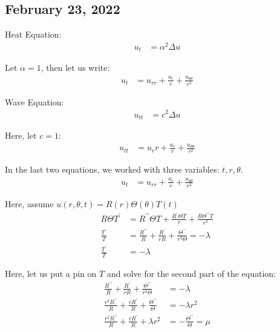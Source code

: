 \documentclass{article}
\begin{document}
\newpage
\subsection*{February 23, 2022}

Heat Equation:
%
\begin{align}
  u_t & = \alpha^2 \Delta u
\end{align}

Let $\alpha = 1$, then let us write:
%
\begin{align}
  u_t & = u_{rr} + \frac{u_r}{r} + \frac{u_{\theta\theta}}{r^2}
\end{align}

Wave Equation:
%
\begin{align}
  u_{tt} & = c^2 \Delta u
\end{align}

Here, let $c = 1$:
%
\begin{align}
  u_{tt} & = u_rr + \frac{u_r}{r} + \frac{u_{\theta\theta}}{r^2}
\end{align}

In the last two equations, we worked with three variables: $t, r, \theta$.
%
\begin{align}
  u_t & = u_{rr} + \frac{u_r}{r} + \frac{u_{\theta\theta}}{r^2}
\end{align}

Here, assume $u(r, \theta, t) = R(r)\Theta(\theta)T(t)$
%
\begin{align}
  R \Theta T^\prime & = R^{\prime\prime} \Theta T + \frac{R^\prime \Theta T}{r} + \frac{R \Theta^{\prime\prime}T}{r^2}\\
  \frac{T^\prime}{T} & = \frac{R^{\prime\prime}}{R} + \frac{R^\prime}{rR} + \frac{\Theta^{\prime\prime}}{r^2 \Theta} = -\lambda\\
  \frac{T^\prime}{T} & = -\lambda
\end{align}

Here, let us put a pin on $T$ and solve for the second part of the equation:
%
\begin{align}
  \frac{R^{\prime\prime}}{R} + \frac{R^\prime}{rR} + \frac{\Theta^{\prime\prime}}{r^2\Theta} & = - \lambda\\
  \frac{r^2R^{\prime\prime}}{R} + \frac{rR^\prime}{R} + \frac{\Theta^{\prime\prime}}{\Theta} & = - \lambda r^2\\
  \frac{r^2 R^{\prime\prime}}{R} +
  \frac{r   R^\prime}{R} +
  \lambda r^2 & = -\frac{\Theta^{\prime\prime}}{\Theta} = \mu
\end{align}
\end{document}
